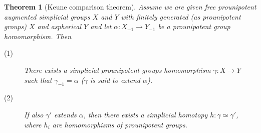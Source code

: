 \documentclass[11pt,a4paper]{article}
\newtheorem{theorem}{Theorem}[section] %
\begin{document}

\begin{theorem}[Keune comparison theorem]\label{nt1}
Assume we are given free prounipotent augmented simplicial groups  $X$ and $Y$ with finitely generated (as prounipotent groups) $X$ and aspherical $Y$ and let $\alpha: X_{-1}\rightarrow Y_{-1}$ be a prounipotent group homomorphism.
Then
\begin{description}
\item[(1)]{There exists a simplicial prounipotent groups homomorphism $\gamma: X\rightarrow Y$ such that $\gamma_{-1}=\alpha$ ($\gamma$ is said to extend $\alpha$).}
\item[(2)]{If also $\gamma'$ extends $\alpha$, then there exists a simplicial homotopy $h:\gamma\simeq\gamma'$, where $h_i$ are homomorphisms of prounipotent groups.}
\end{description}
\end{theorem}
\end{document}
